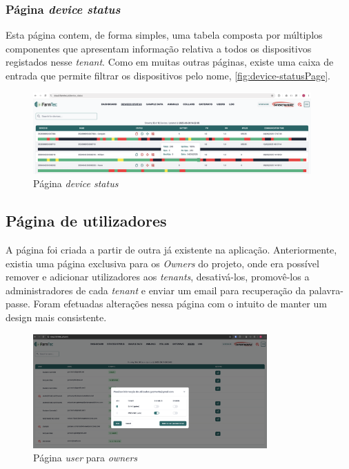 \subsubsection{\textbf{Página \textit{device status}}}

Esta página contem, de forma simples, uma tabela composta por múltiplos componentes que apresentam informação relativa a todos os dispositivos registados nesse \textit{tenant}. Como em muitas outras páginas, existe uma caixa de entrada que permite filtrar os dispositivos pelo nome, \autoref{fig:device-statusPage}.

\begin{figure}[h!]
    \centering
    \includegraphics[width=0.95\textwidth]{figs/device_status_page.png}
    \caption{Página \textit{device status}}
    \label{fig:device-statusPage}
\end{figure}

\subsection{Página de utilizadores} 
A página foi criada a partir de outra já existente na aplicação. Anteriormente, existia uma página exclusiva para os \textit{Owners} do projeto, onde era possível remover e adicionar utilizadores aos \textit{tenants}, desativá-los, promovê-los a administradores de cada \textit{tenant} e enviar um email para recuperação da palavra-passe. Foram efetuadas alterações nessa página com o intuito de manter um design mais consistente.

\begin{figure}[h!]
    \centering
    \includegraphics[width=0.8\textwidth]{figs/userOWNER.png}
    \caption{Página \textit{user} para \textit{owners}}
    \label{fig:user-Owner}
\end{figure}

